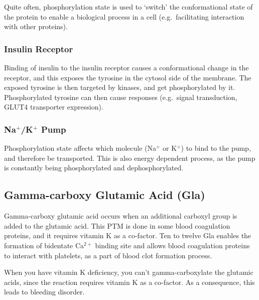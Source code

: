 Quite often, phosphorylation state is used to `switch' the conformational state of the protein to enable a biological process in a cell (e.g.\ facilitating interaction with other proteins).

\subsubsection{Insulin Receptor}

Binding of insulin to the insulin receptor causes a conformational change in the receptor, and this exposes the tyrosine in the cytosol side of the membrane.
The exposed tyrosine is then targeted by kinases, and get phosphorylated by it.
Phosphorylated tyrosine can then cause responses (e.g.\ signal transduction, GLUT4 transporter expression).

\begin{center}
\end{center}

\subsubsection{Na$^+$/K$^+$ Pump}

Phosphorylation state affects which molecule (Na$^+$ or K$^+$) to bind to the pump, and therefore be transported.
This is also energy dependent process, as the pump is constantly being phosphorylated and dephosphorylated.

\begin{center}
\end{center}

\subsection{Gamma-carboxy Glutamic Acid (Gla)}

Gamma-carboxy glutamic acid occurs when an additional carboxyl group is added to the glutamic acid.
This PTM is done in some blood coagulation proteins, and it requires vitamin K as a co-factor.
Ten to twelve Gla enables the formation of bidentate Ca$^{2+}$ binding site and allows blood coagulation proteins to interact with platelets, as a part of blood clot formation process.

When you have vitamin K deficiency, you can't gamma-carboxylate the glutamic acids, since the reaction requires vitamin K as a co-factor.
As a consequence, this leads to bleeding disorder.

